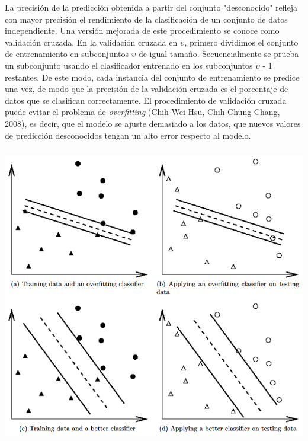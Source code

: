 La precisión de la predicción obtenida a partir del conjunto "desconocido" refleja con mayor precisión el rendimiento de la clasificación de un conjunto de datos independiente.  Una versión mejorada de este procedimiento se conoce como validación cruzada. En la validación cruzada en $\upsilon$, primero dividimos el conjunto de entrenamiento en subconjuntos $\upsilon$ de igual tamaño.  Secuencialmente se prueba un subconjunto usando el clasificador entrenado en los subconjuntos $\upsilon$ - 1 restantes.  De este modo, cada instancia del conjunto de entrenamiento se predice una vez, de modo que la precisión de la validación cruzada es el porcentaje de datos que se clasifican correctamente. El procedimiento de validación cruzada puede evitar el problema de \textit{overfitting} (Chih-Wei Hsu, Chih-Chung Chang, 2008), es decir, que el modelo se ajuste demasiado a los datos, que nuevos valores de predicción desconocidos tengan un alto error respecto al modelo. 

\begin{center}
\includegraphics[height=5.15in]{figuras/Capture2.PNG}
\end{center}

